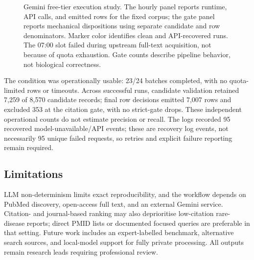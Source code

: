 \begin{figure}[t]
\centering
\begin{minipage}[t]{0.61\textwidth}
\centering
\resizebox{\linewidth}{!}{}
\end{minipage}\hfill
\begin{minipage}[t]{0.36\textwidth}
\centering
\resizebox{\linewidth}{!}{}
\end{minipage}
\caption{Gemini free-tier execution study. The hourly panel reports runtime, API calls, and emitted rows for the fixed corpus; the gate panel reports mechanical dispositions using separate candidate and row denominators. Marker color identifies clean and API-recovered runs. The 07:00 slot failed during upstream full-text acquisition, not because of quota exhaustion. Gate counts describe pipeline behavior, not biological correctness.}
\label{fig:gemini-free-tier-operational}
\end{figure}




The condition was operationally usable: 23/24 batches completed, with no quota-limited rows or timeouts. Across successful runs, candidate validation retained 7,259 of 8,570 candidate records; final row decisions emitted 7,007 rows and excluded 353 at the citation gate, with no strict-gate drops. These independent operational counts do not estimate precision or recall. The logs recorded 95 recovered model-unavailable/API events; these are recovery log events, not necessarily 95 unique failed requests, so retries and explicit failure reporting remain required.

\subsection{Limitations}

LLM non-determinism limits exact reproducibility, and the workflow depends on PubMed discovery, open-access full text, and an external Gemini service. Citation- and journal-based ranking may also deprioritise low-citation rare-disease reports; direct PMID lists or documented focused queries are preferable in that setting. 
Future work includes an expert-labelled benchmark, alternative search sources, and local-model support for fully private processing. All outputs remain research leads requiring professional review.
